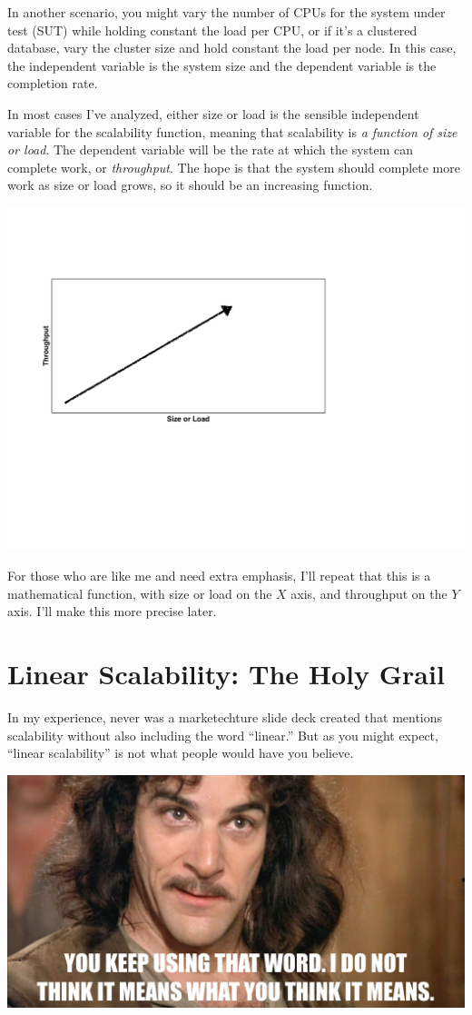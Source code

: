 \documentclass{vivid_layout}
\begin{document}
In another scenario, you might vary the number of CPUs for the system under test
(SUT) while holding constant the load per CPU, or if it's a clustered database,
vary the cluster size and hold constant the load per node. In this case, the
independent variable is the system size and the dependent variable is the
completion rate.

In most cases I've analyzed, either size or load is the sensible independent
variable for the scalability function, meaning that scalability is {\itshape a
function of size or load}.  The dependent variable will be the rate at which the
system can complete work, or {\itshape throughput}. The hope is that the system
should complete more work as size or load grows, so it should be an increasing
function.
\begin{center}
\includegraphics[width=.85\linewidth]{scalability/size-vs-load}
\end{center}

For those who are like me and need extra emphasis, I'll repeat that this is a
mathematical function, with size or load on the $X$ axis, and throughput on the
$Y$ axis. I'll make this more precise later.

\section{Linear Scalability: The Holy Grail}

In my experience, never was a marketechture slide deck created that mentions
scalability without also including the word ``linear.'' But as you might expect,
``linear scalability'' is not what people would have you believe.
\begin{center}
\includegraphics[width=.85\linewidth]{scalability/inigo}
\end{center}
\end{document}
